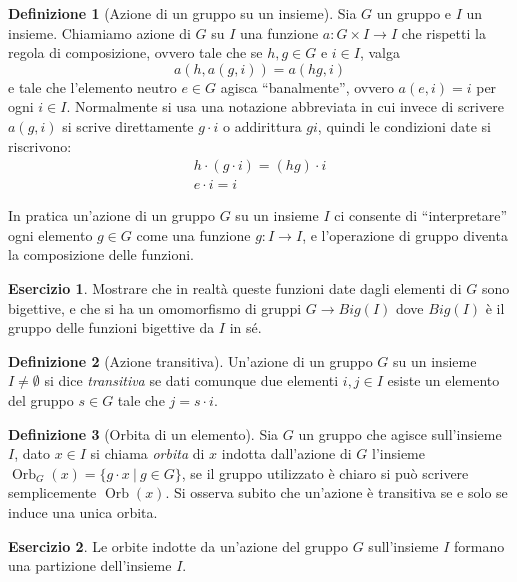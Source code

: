 \documentclass[11pt]{article}
\theoremstyle{plain}
\theoremstyle{definition}
\newtheorem{defn}{Definizione}[section]
\newtheorem{exercise}{Esercizio}[section]
\theoremstyle{remark}
\DeclareMathOperator{\Orb}{Orb}
\begin{document}
\begin{defn}[Azione di un gruppo su un insieme] Sia $G$ un gruppo e $I$ un insieme. Chiamiamo azione di $G$ su $I$ una funzione $a:G\times I \to I$ che rispetti la regola di composizione, ovvero tale che se $h,g\in G$ e $i \in I$, valga
\[ a(h,a(g,i)) = a(hg, i) \]
e tale che l'elemento neutro $e\in G$ agisca ``banalmente'', ovvero $a(e, i) = i$ per ogni $i\in I$.
Normalmente si usa una notazione abbreviata in cui invece di scrivere $a(g,i)$ si scrive direttamente $g\cdot i$ o addirittura $gi$, quindi le condizioni date si riscrivono:
\begin{gather*}
	h\cdot(g\cdot i) = (hg)\cdot i\\
	e\cdot i = i
\end{gather*}
\label{defn:azione}
\end{defn}

In pratica un'azione di un gruppo $G$ su un insieme $I$ ci consente di ``interpretare'' ogni elemento $g\in G$ come una funzione $g:I\to I$, e l'operazione
di gruppo diventa la composizione delle funzioni.
\begin{exercise}
Mostrare che in realtà queste funzioni date dagli elementi di $G$ sono bigettive, e che si ha un omomorfismo di gruppi $G\to Big(I)$ dove $Big(I)$ è il gruppo delle funzioni bigettive da $I$ in sé.
\end{exercise}

\begin{defn}[Azione transitiva]
Un'azione di un gruppo $G$ su un insieme $I\neq \emptyset$ si dice \emph{transitiva} se dati comunque due elementi $i,j\in I$ esiste un elemento del gruppo $s\in G$ tale che $j=s\cdot i$.
\label{defn:azione transitiva}
\end{defn}


\begin{defn}[Orbita di un elemento]
Sia $G$ un gruppo che agisce sull'insieme $I$, dato $x\in I$ si chiama \textit{orbita} di $x$ indotta dall'azione di $G$ l'insieme $\Orb_{G}(x)=\{ g\cdot x\ |\ g\in G \}$, se il gruppo utilizzato è chiaro si può scrivere semplicemente $\Orb(x)$. Si osserva subito che un'azione è transitiva se e solo se induce una unica orbita.
\label{defn:orbita}
\end{defn}

\begin{exercise}
Le orbite indotte da un'azione del gruppo $G$ sull'insieme $I$ formano una partizione dell'insieme $I$. 
\end{exercise}
\end{document}
